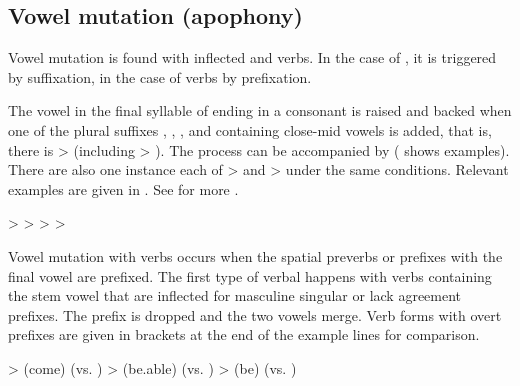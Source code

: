 \subsection{Vowel mutation (apophony)}
\label{ssec:Vowel mutation (apophony)}

Vowel mutation is found with inflected  and verbs. In the case of , it is triggered by suffixation, in the case of verbs by prefixation.

The vowel  in the final syllable of  ending in a consonant is raised and backed when one of the plural suffixes , , , and  containing close-mid vowels is added, that is, there is   >  (including  > ). The process can be accompanied by  ( shows examples). There are also one instance each of  >  and  >  under the same conditions. Relevant examples are given in . See  for more .
%
\begin{exe}
	\label{ex:a u e u e i phon}
	\begin{xlist}
		\ex	{} >  
		\ex	{} >  
		\ex	{} >  
		\ex	{} >  
	\end{xlist}
\end{exe}

Vowel mutation with verbs occurs when the spatial preverbs or  prefixes with the final vowel  are prefixed. The first type of verbal  happens with verbs containing the stem vowel  that are inflected for masculine singular or lack  agreement prefixes. The  prefix is dropped and the two vowels merge. Verb forms with overt  prefixes are given in brackets at the end of the example lines for comparison.
%
\begin{exe}
	\label{ex:a i e phon}
	\begin{xlist}
		\ex	{} >   (come) (vs. \tit{sa-b-irʁ-an}) 
		\ex	{} >   (be.able) (vs. \tit{a-b-irχʷ-ar})
		\ex	{} >   (be) (vs. \tit{ka-r-irg-an=da})
	\end{xlist}
\end{exe}

